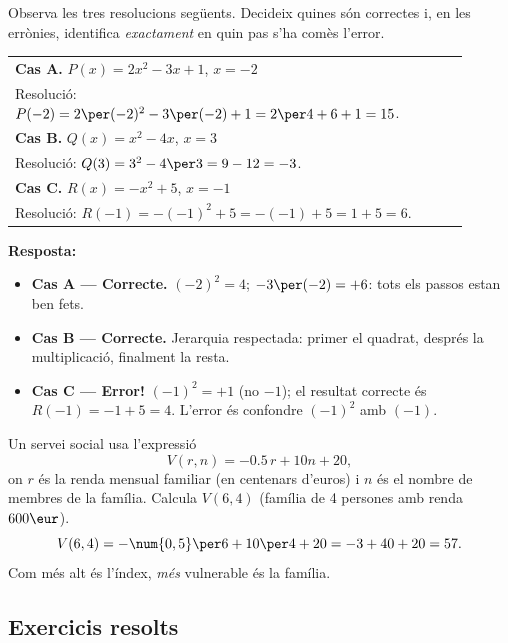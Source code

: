 \begin{exemple}
Observa les tres resolucions següents. Decideix quines són correctes i, en les
errònies, identifica \emph{exactament} en quin pas s'ha comès l'error.

\medskip
\begin{tabular}{@{}p{0.9\linewidth}@{}}
\textbf{Cas A.} $P(x) = 2x^2 - 3x + 1$, \; $x = -2$ \\
\quad Resolució: $P(-2) = 2\per(-2)^2 - 3\per(-2)+1 = 2\per 4+6+1 = 15$. \\[4pt]
\textbf{Cas B.} $Q(x) = x^2 - 4x$, \; $x = 3$ \\
\quad Resolució: $Q(3) = 3^2 - 4\per 3 = 9-12 = -3$. \\[4pt]
\textbf{Cas C.} $R(x) = -x^2 + 5$, \; $x = -1$ \\
\quad Resolució: $R(-1) = -(-1)^2+5 = -(-1)+5 = 1+5 = 6$.
\end{tabular}

\medskip
\textbf{Resposta:}
\begin{itemize}[leftmargin=1.4em, itemsep=2pt]
  \item \textbf{Cas A — Correcte.} $(-2)^2=4$; $-3\per(-2)=+6$: tots els passos
        estan ben fets.
  \item \textbf{Cas B — Correcte.} Jerarquia respectada: primer el quadrat,
        després la multiplicació, finalment la resta.
  \item \textbf{Cas C — Error!} $(-1)^2 = +1$ (no $-1$); el resultat correcte
        és $R(-1)=-1+5=4$. L'error és confondre $(-1)^2$ amb $(-1)$.
\end{itemize}
\end{exemple}

\begin{exemple}
Un servei social usa l'expressió
\[
V(r, n) = -\num{0,5}\,r + 10n + 20,
\]
on $r$ és la renda mensual familiar (en centenars d'euros) i $n$ és el nombre
de membres de la família. Calcula $V(6, 4)$ (família de 4 persones amb renda
$600\eur$).
\[
V(6,4) = -\num{0,5}\per 6 + 10\per 4 + 20 = -3 + 40 + 20 = 57.
\]
Com més alt és l'índex, \emph{més} vulnerable és la família.
\end{exemple}

\subsection{Exercicis resolts}

